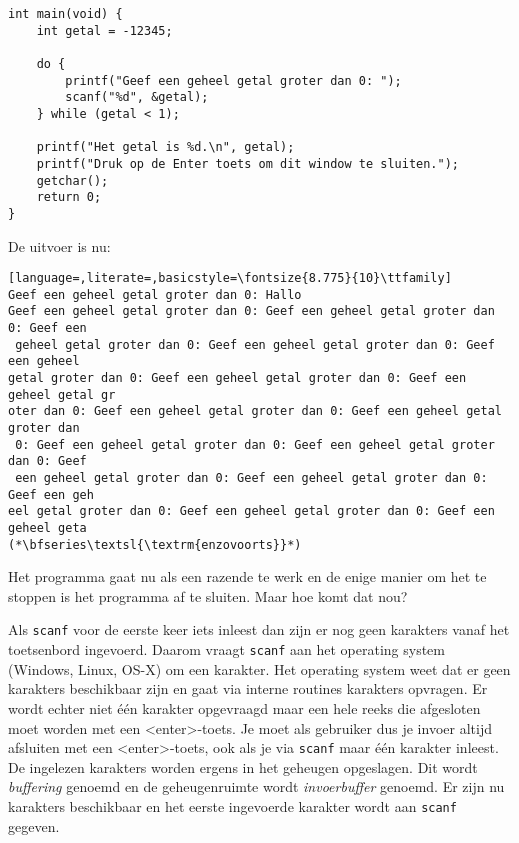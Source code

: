 \documentclass[a4paper,10pt,fleqn,twoside]{article}
\begin{document}
\begin{lstlisting}
int main(void) {
    int getal = -12345;

    do {
        printf("Geef een geheel getal groter dan 0: ");
        scanf("%d", &getal);
    } while (getal < 1);

    printf("Het getal is %d.\n", getal);
    printf("Druk op de Enter toets om dit window te sluiten.");
    getchar();
    return 0;
}
\end{lstlisting}

De uitvoer is nu:

\begin{lstlisting}[language=,literate=,basicstyle=\fontsize{8.775}{10}\ttfamily]
Geef een geheel getal groter dan 0: Hallo
Geef een geheel getal groter dan 0: Geef een geheel getal groter dan 0: Geef een
 geheel getal groter dan 0: Geef een geheel getal groter dan 0: Geef een geheel
getal groter dan 0: Geef een geheel getal groter dan 0: Geef een geheel getal gr
oter dan 0: Geef een geheel getal groter dan 0: Geef een geheel getal groter dan
 0: Geef een geheel getal groter dan 0: Geef een geheel getal groter dan 0: Geef
 een geheel getal groter dan 0: Geef een geheel getal groter dan 0: Geef een geh
eel getal groter dan 0: Geef een geheel getal groter dan 0: Geef een geheel geta
(*\bfseries\textsl{\textrm{enzovoorts}}*)
\end{lstlisting}

Het programma gaat nu als een razende te werk en de enige manier om het te stoppen is het programma af te sluiten. Maar hoe komt dat nou?

Als \lstinline|scanf| voor de eerste keer iets inleest dan zijn er nog geen karakters vanaf het toetsenbord ingevoerd. Daarom vraagt \lstinline|scanf| aan het operating system (Windows, Linux, OS-X) om een karakter. Het operating system weet dat er geen karakters beschikbaar zijn en gaat via interne routines karakters opvragen. Er wordt echter niet één karakter opgevraagd maar een hele reeks die afgesloten moet worden met een <enter>-toets. Je moet als gebruiker dus je invoer altijd afsluiten met een <enter>-toets, ook als je via \lstinline|scanf| maar één karakter inleest. De ingelezen karakters worden ergens in het geheugen opgeslagen. Dit wordt \textsl{buffering} genoemd en de geheugenruimte wordt \textsl{invoerbuffer} genoemd. Er zijn nu karakters beschikbaar en het eerste ingevoerde karakter wordt aan \lstinline|scanf| gegeven.
\end{document}
